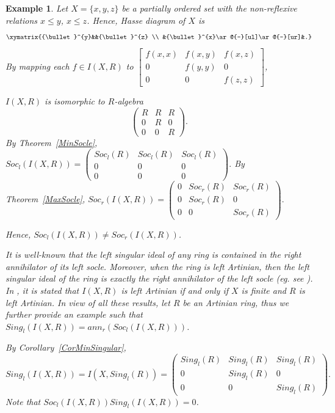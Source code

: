 \documentclass[12pt]{article}
\newtheorem{example}[theorem]{Example}
\begin{document}
\begin{example}
\label{Exfinite} Let $X =\{x,y,z\}$ be a partially ordered set with the
non-reflexive relations $x \leq y $, $x \leq z$. Hence, Hasse diagram of $X$
is 
\begin{equation*}
\xymatrix{{\bullet}^{y}&&{\bullet}^{z} \\
&{\bullet}^{x}\ar@{-}[ul]\ar@{-}[ur]&.}
\end{equation*}
By mapping each $f \in I(X,R)$ to $\left [ 
\begin{array}{ccc}
f(x,x) & f(x,y) & f(x,z) \\ 
0 & f(y,y) & 0 \\ 
0 & 0 & f(z,z)%
\end{array}
\right ]$,

${I(X,R)}$ is isomorphic to $R$-algebra 
\begin{equation*}
\left( 
\begin{array}{ccc}
R & R & R \\ 
0 & R & 0 \\ 
0 & 0 & R%
\end{array}
\right).
\end{equation*}
By Theorem~\ref{MinSocle}, $Soc_l({I(X,R)}) = \left( 
\begin{array}{ccc}
Soc_l(R) & Soc_l(R) & Soc_l(R) \\ 
0 & 0 & 0 \\ 
0 & 0 & 0%
\end{array}
\right).$ 
By Theorem~\ref{MaxSocle}, $Soc_r({I(X,R)}) = \left( 
\begin{array}{ccc}
0 & Soc_r(R) & Soc_r(R) \\ 
0 & Soc_r(R) & 0 \\ 
0 & 0 & Soc_r(R)%
\end{array}
\right).$ 

Hence, $Soc_l({I(X,R)}) \neq Soc_r({I(X,R)})$.

It is well-known that the left singular ideal of any ring is contained in
the right annihilator of its left socle. Moreover, when the ring is left
Artinian, then the left singular ideal of the ring is exactly the right
annihilator of the left socle (eg. see \cite[Proposition 2.1.4]{Lam:Lectures}). In \cite[Ch.8, p.305]{SO:IncAlg}, it is stated that ${I(X,R)}$ is left Artinian if and only if $X$ is finite and $R$ is left
Artinian. In view of all these results, let $R$ be an Artinian ring, thus we further provide an example such that 
$Sing_l({I(X,R)}) = ann_r(Soc_l({I(X,R)}))$.

By Corollary~\ref{CorMinSingular}, 
\begin{equation*}
Sing_l({I(X,R)}) = I(X,Sing_l(R))= \left( 
\begin{array}{ccc}
Sing_l(R) & Sing_l(R) & Sing_l(R) \\ 
0 & Sing_l(R) & 0 \\ 
0 & 0 & Sing_l(R)%
\end{array}
\right) .
\end{equation*}
Note that $Soc_l({I(X,R)}) Sing_l({I(X,R)}) = 0$.
\end{example}
\end{document}
